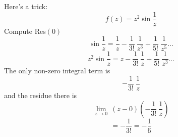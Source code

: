 \documentclass[11pt, oneside]{article}
\begin{document}
Here's a trick:
\[ f(z) = z^2 \sin \frac{1}{z} \]
Compute Res$(0)$
\[ \sin \frac{1}{z} = \frac{1}{z} - \frac{1}{3!} \ \frac{1}{z^3} + \frac{1}{5!} \ \frac{1}{z^5} \dots \]
\[ z^2 \sin \frac{1}{z} = z - \frac{1}{3!} \ \frac{1}{z} + \frac{1}{5!} \ \frac{1}{z^3} \dots \]
The only non-zero integral term is 
\[ - \frac{1}{3!} \ \frac{1}{z} \]
and the residue there is
\[ \lim_{z \rightarrow 0} \ (z - 0) (- \frac{1}{3!} \ \frac{1}{z}) \]
\[ = - \frac{1}{3!} = - \frac{1}{6} \]
\end{document}
